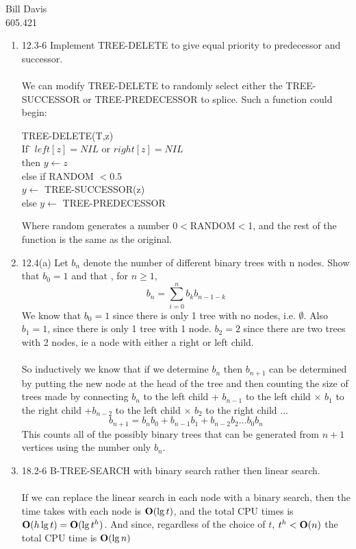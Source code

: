 \documentclass[11pt,fleqn]{article}
\begin{document}
\newcommand{\mbf}[1]{\mbox{{\bfseries #1}}}
\newcommand{\N}{\mbf{N}}
\renewcommand{\O}{\mbf{O}}

\noindent Bill Davis \\
605.421 

\begin{enumerate}
\item
12.3-6 Implement TREE-DELETE to give equal priority to predecessor and successor.\\
\\
We can modify TREE-DELETE to randomly select either the TREE-SUCCESSOR or TREE-PREDECESSOR to splice. Such a function could begin:\\

\begin{tabbing}
TREE-DELETE(T,z) \\
If \= $ left[z] = NIL$ or $right[z] = NIL$ \\
	\> then $y \leftarrow z$ \\
	\> else \= if RANDOM $< 0.5$ \\
	\> \> $y \leftarrow$ TREE-SUCCESSOR(z)  \\
	\> \> else $y \leftarrow$ TREE-PREDECESSOR \\
\end{tabbing}
Where random generates a number 0$<$RANDOM$<$1, and the rest of the function is the same as the original. 

\item
12.4(a) Let $ b_{n}$ denote the number of different binary trees with n nodes. Show that $b_{0} = 1$ and that , for $n \geq 1$,
\[
b_{n} = \displaystyle\sum_{i=0}^n b_{k}b_{n-1-k}
\]
We know that $b_{0} = 1$  since there is only 1 tree with no nodes, i.e. $\emptyset$. Also $b_{1} = 1$, since there is only 1 tree with 1 node. $b_{2} = 2$ since there are two trees with 2 nodes, ie a node with either a right or left child. \\
\\
So inductively we know that if we determine $b_{n}$ then $b_{n+1}$ can be determined by putting the new node at the head of the tree and then counting the size of trees made by connecting $b_{n}$ to the left child + $b_{n-1}$ to the left child $\times$ $b_{1}$ to the right child +$b_{n-2}$ to the left child $\times$ $b_{2}$ to the right child ... \[
b_{n+1} = b_{n}  b_{0} + b_{n-1} b_{1} + b_{n-2}b_{2} ... b_{0} b_{n}
\]
This counts all of the possibly binary trees that can be generated from $n+1$ vertices using the number only $b_{n}$. 

\item
18.2-6 B-TREE-SEARCH with binary search rather then linear search. \\
\\
If we can replace the linear search in each node with a binary search, then the time takes with each node is $\O(\lg t)$, and the total CPU times is $\O(h \lg t) = \O(\lg t^{h})$. And since, regardless of the choice of $t$, $t^{h} < \O(n)$ the total CPU time is $\O(\lg n)$


\end{enumerate}
\end{document}
